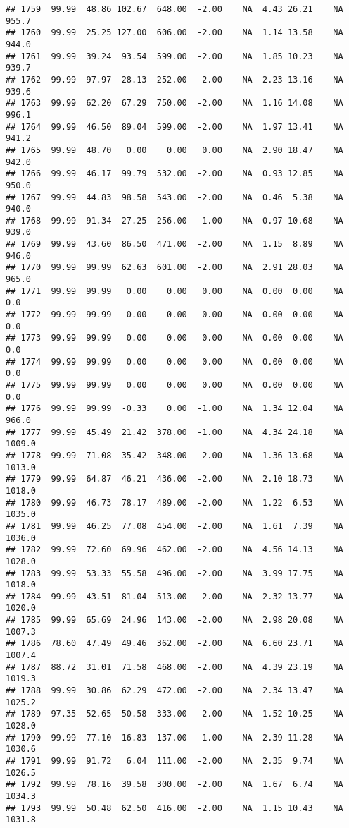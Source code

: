 \documentclass{article}\usepackage{graphicx, color}
\makeatletter
\newenvironment{kframe}{%
 \def\at@end@of@kframe{}%
 \ifinner\ifhmode%
  \def\at@end@of@kframe{\end{minipage}}%
  \begin{minipage}{\columnwidth}%
 \fi\fi%
 \def\FrameCommand##1{\hskip\@totalleftmargin \hskip-\fboxsep
 \colorbox{shadecolor}{##1}\hskip-\fboxsep
     \hskip-\linewidth \hskip-\@totalleftmargin \hskip\columnwidth}%
 \MakeFramed {\advance\hsize-\width
   \@totalleftmargin\z@ \linewidth\hsize
   \@setminipage}}%
 {\par\unskip\endMakeFramed%
 \at@end@of@kframe}
\newenvironment{knitrout}{}{} %
\makeatother
\begin{document}
\begin{knitrout}
\begin{kframe}
\begin{verbatim}
## 1759  99.99  48.86 102.67  648.00  -2.00    NA  4.43 26.21    NA  955.7
## 1760  99.99  25.25 127.00  606.00  -2.00    NA  1.14 13.58    NA  944.0
## 1761  99.99  39.24  93.54  599.00  -2.00    NA  1.85 10.23    NA  939.7
## 1762  99.99  97.97  28.13  252.00  -2.00    NA  2.23 13.16    NA  939.6
## 1763  99.99  62.20  67.29  750.00  -2.00    NA  1.16 14.08    NA  996.1
## 1764  99.99  46.50  89.04  599.00  -2.00    NA  1.97 13.41    NA  941.2
## 1765  99.99  48.70   0.00    0.00   0.00    NA  2.90 18.47    NA  942.0
## 1766  99.99  46.17  99.79  532.00  -2.00    NA  0.93 12.85    NA  950.0
## 1767  99.99  44.83  98.58  543.00  -2.00    NA  0.46  5.38    NA  940.0
## 1768  99.99  91.34  27.25  256.00  -1.00    NA  0.97 10.68    NA  939.0
## 1769  99.99  43.60  86.50  471.00  -2.00    NA  1.15  8.89    NA  946.0
## 1770  99.99  99.99  62.63  601.00  -2.00    NA  2.91 28.03    NA  965.0
## 1771  99.99  99.99   0.00    0.00   0.00    NA  0.00  0.00    NA    0.0
## 1772  99.99  99.99   0.00    0.00   0.00    NA  0.00  0.00    NA    0.0
## 1773  99.99  99.99   0.00    0.00   0.00    NA  0.00  0.00    NA    0.0
## 1774  99.99  99.99   0.00    0.00   0.00    NA  0.00  0.00    NA    0.0
## 1775  99.99  99.99   0.00    0.00   0.00    NA  0.00  0.00    NA    0.0
## 1776  99.99  99.99  -0.33    0.00  -1.00    NA  1.34 12.04    NA  966.0
## 1777  99.99  45.49  21.42  378.00  -1.00    NA  4.34 24.18    NA 1009.0
## 1778  99.99  71.08  35.42  348.00  -2.00    NA  1.36 13.68    NA 1013.0
## 1779  99.99  64.87  46.21  436.00  -2.00    NA  2.10 18.73    NA 1018.0
## 1780  99.99  46.73  78.17  489.00  -2.00    NA  1.22  6.53    NA 1035.0
## 1781  99.99  46.25  77.08  454.00  -2.00    NA  1.61  7.39    NA 1036.0
## 1782  99.99  72.60  69.96  462.00  -2.00    NA  4.56 14.13    NA 1028.0
## 1783  99.99  53.33  55.58  496.00  -2.00    NA  3.99 17.75    NA 1018.0
## 1784  99.99  43.51  81.04  513.00  -2.00    NA  2.32 13.77    NA 1020.0
## 1785  99.99  65.69  24.96  143.00  -2.00    NA  2.98 20.08    NA 1007.3
## 1786  78.60  47.49  49.46  362.00  -2.00    NA  6.60 23.71    NA 1007.4
## 1787  88.72  31.01  71.58  468.00  -2.00    NA  4.39 23.19    NA 1019.3
## 1788  99.99  30.86  62.29  472.00  -2.00    NA  2.34 13.47    NA 1025.2
## 1789  97.35  52.65  50.58  333.00  -2.00    NA  1.52 10.25    NA 1028.0
## 1790  99.99  77.10  16.83  137.00  -1.00    NA  2.39 11.28    NA 1030.6
## 1791  99.99  91.72   6.04  111.00  -2.00    NA  2.35  9.74    NA 1026.5
## 1792  99.99  78.16  39.58  300.00  -2.00    NA  1.67  6.74    NA 1034.3
## 1793  99.99  50.48  62.50  416.00  -2.00    NA  1.15 10.43    NA 1031.8

\end{verbatim}
\end{kframe}
\end{knitrout}
\end{document}
